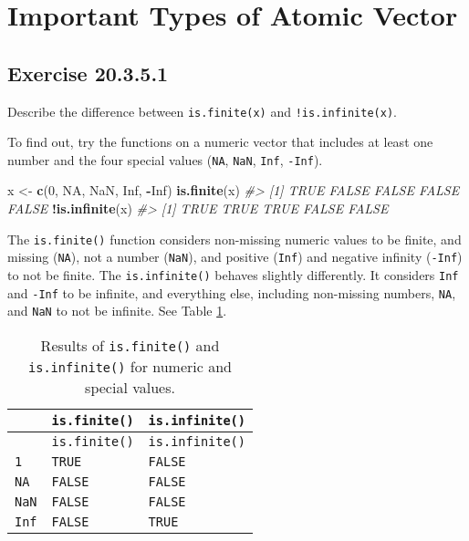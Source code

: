 \documentclass[]{book}
\newenvironment{Shaded}{\begin{snugshade}}{\end{snugshade}}
\newcommand{\CommentTok}[1]{\textcolor[rgb]{0.56,0.35,0.01}{\textit{#1}}}
\newcommand{\DecValTok}[1]{\textcolor[rgb]{0.00,0.00,0.81}{#1}}
\newcommand{\KeywordTok}[1]{\textcolor[rgb]{0.13,0.29,0.53}{\textbf{#1}}}
\newcommand{\NormalTok}[1]{#1}
\newcommand{\OperatorTok}[1]{\textcolor[rgb]{0.81,0.36,0.00}{\textbf{#1}}}
\newcommand{\OtherTok}[1]{\textcolor[rgb]{0.56,0.35,0.01}{#1}}
\newcommand{\StringTok}[1]{\textcolor[rgb]{0.31,0.60,0.02}{#1}}
\theoremstyle{plain}
\theoremstyle{remark}
\begin{document}
\hypertarget{important-types-of-atomic-vector}{%
\section{Important Types of Atomic
Vector}\label{important-types-of-atomic-vector}}

\hypertarget{exercise-20.3.5.1}{%
\subsection*{\texorpdfstring{Exercise
{20.3.5.1}}{Exercise 20.3.5.1}}\label{exercise-20.3.5.1}}

Describe the difference between \texttt{is.finite(x)} and
\texttt{!is.infinite(x)}.

To find out, try the functions on a numeric vector that includes at
least one number and the four special values (\texttt{NA}, \texttt{NaN},
\texttt{Inf}, \texttt{-Inf}).

\begin{Shaded}
\begin{Highlighting}[]
\NormalTok{x <-}\StringTok{ }\KeywordTok{c}\NormalTok{(}\DecValTok{0}\NormalTok{, }\OtherTok{NA}\NormalTok{, }\OtherTok{NaN}\NormalTok{, }\OtherTok{Inf}\NormalTok{, }\OperatorTok{-}\OtherTok{Inf}\NormalTok{)}
\KeywordTok{is.finite}\NormalTok{(x)}
\CommentTok{#> [1]  TRUE FALSE FALSE FALSE FALSE}
\OperatorTok{!}\KeywordTok{is.infinite}\NormalTok{(x)}
\CommentTok{#> [1]  TRUE  TRUE  TRUE FALSE FALSE}
\end{Highlighting}
\end{Shaded}

The \texttt{is.finite()} function considers non-missing numeric values
to be finite, and missing (\texttt{NA}), not a number (\texttt{NaN}),
and positive (\texttt{Inf}) and negative infinity (\texttt{-Inf}) to not
be finite. The \texttt{is.infinite()} behaves slightly differently. It
considers \texttt{Inf} and \texttt{-Inf} to be infinite, and everything
else, including non-missing numbers, \texttt{NA}, and \texttt{NaN} to
not be infinite. See Table \ref{tab:finite-infinite}.

\begin{longtable}[]{@{}lll@{}}
\caption{\label{tab:finite-infinite} Results of \texttt{is.finite()} and
\texttt{is.infinite()} for numeric and special values.}\tabularnewline
\toprule
& \texttt{is.finite()} & \texttt{is.infinite()}\tabularnewline
\midrule
\endfirsthead
\toprule
& \texttt{is.finite()} & \texttt{is.infinite()}\tabularnewline
\midrule
\endhead
\texttt{1} & \texttt{TRUE} & \texttt{FALSE}\tabularnewline
\texttt{NA} & \texttt{FALSE} & \texttt{FALSE}\tabularnewline
\texttt{NaN} & \texttt{FALSE} & \texttt{FALSE}\tabularnewline
\texttt{Inf} & \texttt{FALSE} & \texttt{TRUE}\tabularnewline
\bottomrule
\end{longtable}
\end{document}
